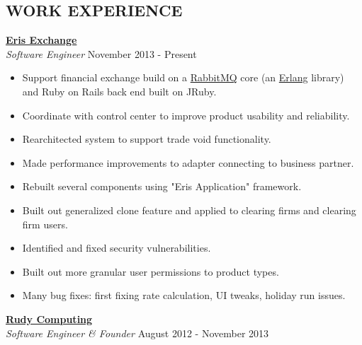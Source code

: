 \documentclass[margin]{res}
\begin{document}
\begin{resume}
\vspace{-2mm}
\section{ WORK EXPERIENCE} 
  {\bf \href{http://www.erisfutures.com/}{Eris Exchange}}\\
  {\sl Software Engineer} \hfill November 2013 - Present
\vspace{-5mm}
  \begin{itemize}
    \itemsep -2pt %
    \item Support financial exchange build on a \href{http://www.rabbitmq.com/}{RabbitMQ} core (an \href{http://www.erlang.org/}{Erlang} library) and Ruby on Rails back end built on JRuby.
    \item Coordinate with control center to improve product usability and reliability.
    \item Rearchitected system to support trade void functionality.
    \item Made performance improvements to adapter connecting to business partner.
    \item Rebuilt several components using "Eris Application" framework.
    \item Built out generalized clone feature and applied to clearing firms and clearing firm users.
    \item Identified and fixed security vulnerabilities.
    \item Built out more granular user permissions to product types.
    \item Many bug fixes: first fixing rate calculation, UI tweaks, holiday run issues.
  \end{itemize}

  {\bf \href{http://www.rudycomputing.io/}{Rudy Computing}}\\
  {\sl Software Engineer \& Founder} \hfill August 2012 - November 2013
  

\end{resume}
\end{document}
